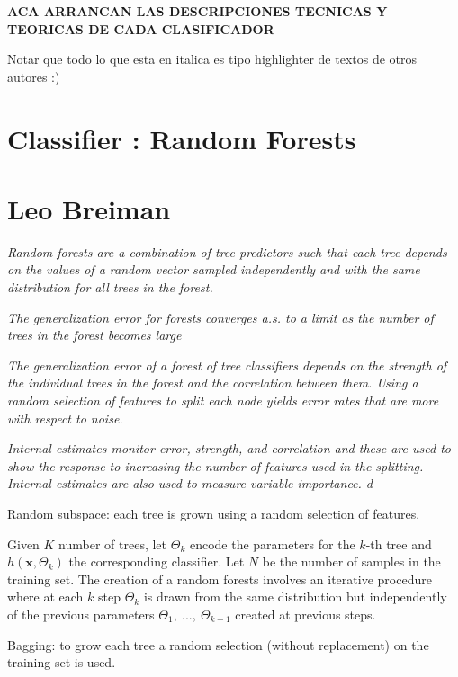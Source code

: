 \textbf{ACA ARRANCAN LAS DESCRIPCIONES TECNICAS Y TEORICAS DE CADA CLASIFICADOR}

Notar que todo lo que esta en italica es tipo highlighter de textos de otros autores :)


\section{Classifier : Random Forests}


\section{Leo Breiman}\cite{breiman-randomforests}


\textit{
Random forests are a combination of tree predictors
such that each tree depends on the values of a random
vector sampled independently and with the same
distribution for all trees in the forest.}

\textit{The generalization error for forests converges a.s. to a limit
as the number of trees in the forest becomes large}

\textit{The generalization error of a forest of tree classifiers depends on the strength of the individual trees in the
forest and the correlation between them. Using a random selection of features to split each node yields
error rates that are more with respect to noise.}

\textit{Internal estimates monitor error, strength, and correlation and these are used to show
the response to increasing the number of features used in the splitting. Internal estimates are also used to
measure variable importance.
d}



Random subspace: each tree is grown using a random selection of features.

Given $K$ number of trees, let $\Theta_k$ encode the parameters for the $k$-th tree and $h(\textbf{x},\Theta_k)$ the corresponding classifier. Let $N$ be the number of samples in the training set. The creation of a random forests involves an iterative procedure where at each $k$ step $\Theta_k$ is drawn from the same distribution but independently of the previous parameters $\Theta_1, \ ..., \ \Theta_{k-1}$ created at previous steps. 

Bagging: to grow each tree a random selection (without replacement) on the training set is used. 


